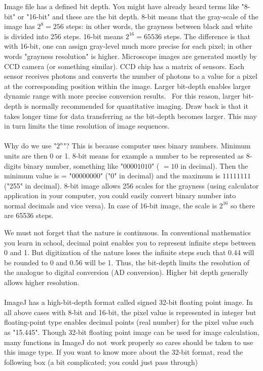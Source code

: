 Image file has a defined bit depth. You might have already
heard terms like "8-bit" or
"16-bit" and these are the bit depth. 8-bit
means that the gray-scale of the image has $2^{8} = 256$
steps: in other words, the grayness between black and white is divided
into 256 steps. 16-bit means $2^{16} = 65536$ steps. The
difference is that with 16-bit, one can assign gray-level much more
precise for each pixel; in other words "grayness
resolution" is higher. Microscope images are generated
mostly by CCD camera (or something similar). 
CCD chip has a matrix of sensors. Each sensor receives
photons and converts the number of photons to a value for a
pixel at the corresponding position within the image. Larger bit-depth
enables larger dynamic range with more precise conversion results.~ For
this reason, larger bit-depth is normally recommended for quantitative
imaging. Draw back is that it takes longer time for data transferring
as the bit-depth becomes larger. This may in turn limits the time
resolution of image sequences. \\
~\\
Why do we use "$2^{n}$"? This
is because computer uses binary numbers. Minimum units are then 0 or 1.
8-bit means for example a number to be represented as 8-digits binary
number, something like "$00001010$" ( $= 10$ in
decimal). Then the minimum value is =
"$00000000$" ("0" in decimal) and the maximum is $11111111$
("255" in decimal). 8-bit image allows 256
scales for the grayness (using calculator application in your computer,
you could easily convert binary number into normal decimals and vice
versa). In case of 16-bit image, the scale is $2^{16}$ so
there are 65536 steps. 


We must not forget that the nature is continuous. In conventional
mathematics you learn in school, decimal point enables you to represent
infinite steps between 0 and 1. But digitization of the nature loses
the infinite steps such that 0.44 will be rounded to 0 and 0.56 will be
1. Thus, the bit-depth limits the resolution of the analogue to digital
conversion (AD conversion). Higher bit depth generally allows higher
resolution.\\
\\
ImageJ has a high-bit-depth format called signed 32-bit floating point
image. In all above cases with 8-bit and 16-bit, the pixel value is
represented in integer but floating-point type enables decimal points
(real number) for the pixel value such as
"15.445". Though 32-bit floating point
image can be used for image calculation, many functions in ImageJ do
not~work properly so cares should be taken to use this image type. If
you want to know more about the 32-bit format, read the following box
(a bit complicated; you could just pass through)

